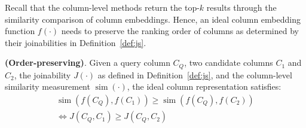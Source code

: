 


Recall that the column-level methods return the top-$k$ results through the similarity comparison of column embeddings. 
Hence, an ideal column embedding function $f(\cdot)$ needs to preserve the ranking order of columns as determined by their joinabilities in Definition~\ref{def:js}.


\begin{myProp}
\label{prop:3}
\textnormal{\textbf{(Order-preserving)}.} 
Given a query column $C_Q$, two candidate columns $C_1$ and $C_2$, the joinability $J(\cdot)$ as defined in Definition~\ref{def:js}, and the column-level similarity measurement $\operatorname{sim}(\cdot)$, the ideal column representation satisfies:
\begin{equation}
\begin{gathered}
\operatorname{sim}\left(f\left(C_Q\right), f\left(C_1\right)\right) \geq \operatorname{sim}\left(f\left(C_Q\right), f\left(C_2\right)\right) \\
\Leftrightarrow J\left(C_Q, C_1\right) \geq J\left(C_Q, C_2\right)
\end{gathered}
\end{equation}

\end{myProp}


